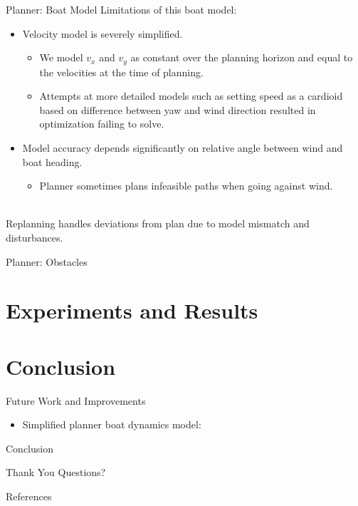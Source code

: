\documentclass[10pt,xcolor={table,dvipsnames},t]{beamer}
\begin{document}
\begin{frame}{Planner: Boat Model}
    Limitations of this boat model:
    \begin{itemize}
        \item Velocity model is severely simplified.
            \begin{itemize}
                \item We model \(v_x\) and \(v_y\) as constant over the planning horizon and equal to the velocities at the time of planning.
                \item Attempts at more detailed models such as setting speed as a cardioid based on difference between yaw and wind direction resulted in optimization failing to solve.
            \end{itemize}
        \item Model accuracy depends significantly on relative angle between wind and boat heading.
        \begin{itemize}
            \item Planner sometimes plans infeasible paths when going against wind.
        \end{itemize}
    \end{itemize}
    
    \hfill\\
    Replanning handles deviations from plan due to model mismatch and disturbances.
\end{frame}

\begin{frame}{Planner: Obstacles}

\end{frame}

\section{Experiments and Results}

\section{Conclusion}

\begin{frame}{Future Work and Improvements}

\begin{itemize}
    \item Simplified planner boat dynamics model:
\end{itemize}
    
\end{frame}

\begin{frame}{Conclusion}
    
\end{frame}

\begin{frame}{Thank You}
    Questions?
\end{frame}


\begin{frame}{References}
    \printbibliography{}
\end{frame}
\end{document}
